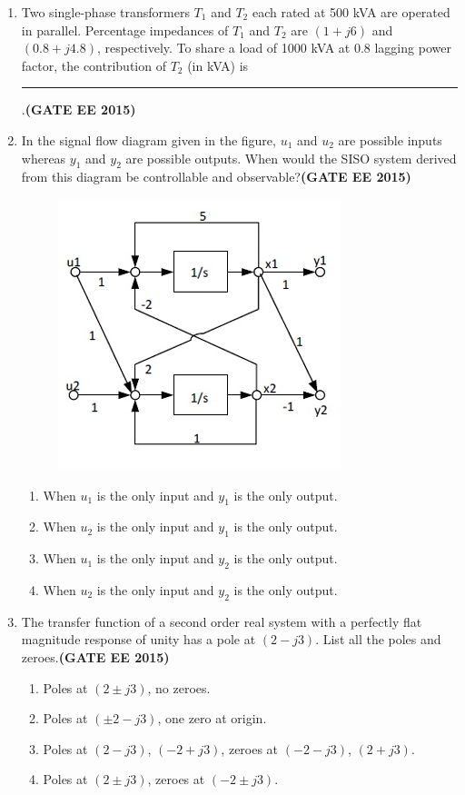 \documentclass[a4paper,12pt]{exam}
\theoremstyle{remark}
\begin{document}
\begin{enumerate}
\item Two single-phase transformers $T_1$ and $T_2$ each rated at 500 kVA are operated in parallel. Percentage impedances of $T_1$ and $T_2$ are $(1 + j6)$ and $(0.8 + j4.8)$, respectively. To share a load of 1000 kVA at 0.8 lagging power factor, the contribution of $T_2$ (in kVA) is \rule{3cm}{0.15mm}.\hfill{\textbf{(GATE EE 2015)}}

\item In the signal flow diagram given in the figure, $u_1$ and $u_2$ are possible inputs whereas $y_1$ and $y_2$ are possible outputs. When would the SISO system derived from this diagram be controllable and observable?\hfill{\textbf{(GATE EE 2015)}}
\begin{figure}[H]
    \centering
    \includegraphics[width=0.5\columnwidth]{figs/Q 62.png}
    \caption{}
    \label{fig:placeholder}
\end{figure}
    \begin{enumerate}
        \item When $u_1$ is the only input and $y_1$ is the only output.
        \item When $u_2$ is the only input and $y_1$ is the only output.
        \item When $u_1$ is the only input and $y_2$ is the only output.
        \item When $u_2$ is the only input and $y_2$ is the only output.
    \end{enumerate}

\item The transfer function of a second order real system with a perfectly flat magnitude response of unity has a pole at $(2 - j3)$. List all the poles and zeroes.\hfill{\textbf{(GATE EE 2015)}}
    \begin{enumerate}
        \item Poles at $(2 \pm j3)$, no zeroes.
        \item Poles at $(\pm 2 - j3)$, one zero at origin.
        \item Poles at $(2 - j3)$, $(-2 + j3)$, zeroes at $(-2 - j3)$, $(2 + j3)$.
        \item Poles at $(2 \pm j3)$, zeroes at $(-2 \pm j3)$.
    \end{enumerate}


\end{enumerate}
\end{document}
